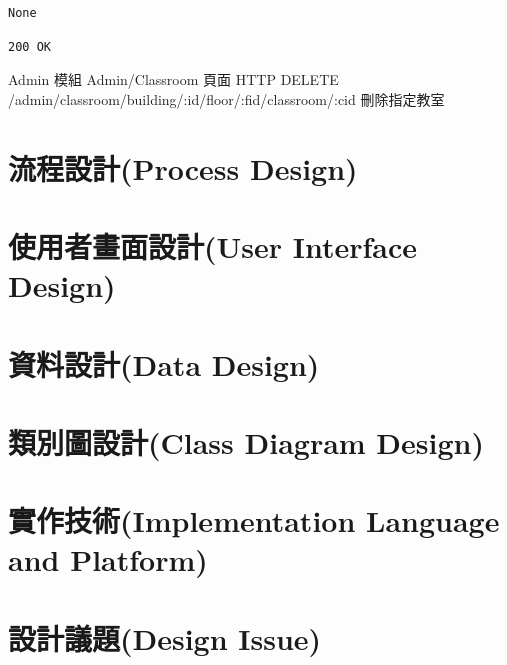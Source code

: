 \documentclass{article}
\begin{document}
\bigskip

\begin{lrbox}{\jsoninputbox}
	\begin{lstlisting}
None
\end{lstlisting}
\end{lrbox}

\begin{lrbox}{\jsonoutputbox}
	\begin{lstlisting}
200 OK
\end{lstlisting}
\end{lrbox}

{Admin 模組}
{Admin/Classroom 頁面}
{HTTP DELETE}
{/admin/classroom/building/:id/floor/:fid/classroom/:cid}
{刪除指定教室}




\newpage

\section[流程設計(PROCESS DESIGN)]{流程設計(Process Design)}

\newpage

\section[使用者畫面設計(USER INTERFACE DESIGN)]{使用者畫面設計(User Interface Design)}

\newpage

\section[資料設計(DATA DESIGN)]{資料設計(Data Design)}

\newpage

\section[類別圖設計(CLASS DIAGRAM DESIGN)]{類別圖設計(Class Diagram Design)}

\newpage

\section[實作技術(IMPLEMENTATION LANGUAGE AND PLATFORM)]{實作技術(Implementation Language and Platform)}

\newpage

\section[設計議題(DESIGN ISSUE)]{設計議題(Design Issue)}
\end{document}
